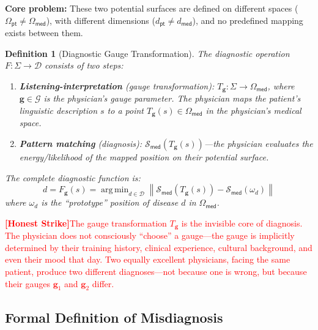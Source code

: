 \documentclass[12pt,a4paper]{article}
\newtheorem{definition}[theorem]{Definition}
\theoremstyle{remark}
\newcommand{\G}{\mathcal{G}}
\newcommand{\med}{\textsf{med}}
\newcommand{\pt}{\textsf{pt}}
\DeclareMathOperator{\argmin}{arg\,min}
\newcommand{\honestcrit}[1]{%
    \textcolor{red}{\textbf{[Honest Strike]}#1}%
}
\begin{document}
\textbf{Core problem:} These two potential surfaces are defined on different spaces ($\Omega_{\pt} \neq \Omega_{\med}$), with different dimensions ($d_{\pt} \neq d_{\med}$), and no predefined mapping exists between them.

\begin{definition}[Diagnostic Gauge Transformation]\label{def:diagnostic_gauge}
The diagnostic operation $F: \Sigma \to \mathcal{D}$ consists of two steps:
\begin{enumerate}[label=(\roman*)]
    \item \textbf{Listening-interpretation} (gauge transformation): $T_{\mathbf{g}}: \Sigma \to \Omega_{\med}$, where $\mathbf{g} \in \G$ is the physician's gauge parameter. The physician maps the patient's linguistic description $s$ to a point $T_{\mathbf{g}}(s) \in \Omega_{\med}$ in the physician's medical space.
    \item \textbf{Pattern matching} (diagnosis): $\mathcal{S}_{\med}(T_{\mathbf{g}}(s))$---the physician evaluates the energy/likelihood of the mapped position on their potential surface.
\end{enumerate}
The complete diagnostic function is:
\begin{equation}
    d = F_{\mathbf{g}}(s) = \argmin_{d \in \mathcal{D}} \left\| \mathcal{S}_{\med}(T_{\mathbf{g}}(s)) - \mathcal{S}_{\med}(\omega_d) \right\|
\end{equation}
where $\omega_d$ is the ``prototype'' position of disease $d$ in $\Omega_{\med}$.
\end{definition}

\honestcrit{The gauge transformation $T_{\mathbf{g}}$ is the invisible core of diagnosis. The physician does not consciously ``choose'' a gauge---the gauge is implicitly determined by their training history, clinical experience, cultural background, and even their mood that day. Two equally excellent physicians, facing the same patient, produce two different diagnoses---not because one is wrong, but because their gauges $\mathbf{g}_1$ and $\mathbf{g}_2$ differ.}

\subsection{Formal Definition of Misdiagnosis}
\end{document}
